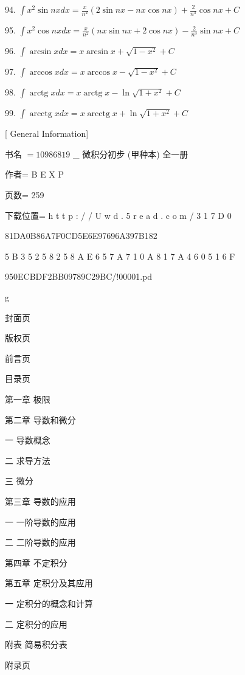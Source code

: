 \documentclass[10pt]{article}
\begin{document}
94. \(\int {x}^{2}\sin {nxdx} = \frac{x}{{n}^{2}}\left( {2\sin {nx} - {nx}\cos {nx}}\right) + \frac{2}{{n}^{3}}\cos {nx} + C\)

95. \(\int {x}^{2}\cos {nxdx} = \frac{x}{{n}^{2}}\left( {{nx}\sin {nx} + 2\cos {nx}}\right) - \frac{2}{{n}^{3}}\sin {nx} + C\)

96. \(\int \arcsin {xdx} = x\arcsin x + \sqrt{1 - {x}^{2}} + C\)

97. \(\int \arccos {xdx} = x\arccos x - \sqrt{1 - {x}^{2}} + C\)

98. \(\int \operatorname{arctg}{xdx} = x\operatorname{arctg}x - \ln \sqrt{1 + {x}^{2}} + C\)

99. \(\int \operatorname{arcctg}{xdx} = x\operatorname{arcctg}x + \ln \sqrt{1 + {x}^{2}} + C\)

[ General Information]

书名 \(= {10986819}\) \_ 微积分初步 (甲种本) 全一册

作者= B E X P

页数= 259

下载位置= h t t p : / / U w d . 5 r e a d . c o m / 3 1 7 D 0

81DA0B86A7F0CD5E6E97696A397B182

5 B 3 5 2 5 8 2 5 8 A E 6 5 7 A 7 1 0 A 8 1 7 A 4 6 0 5 1 6 F

950ECBDF2BB09789C29BC/!00001.pd

g

封面页

版权页

前言页

目录页

第一章 极限

第二章 导数和微分

一 导数概念

二 求导方法

三 微分

第三章 导数的应用

一 一阶导数的应用

二 二阶导数的应用

第四章 不定积分

第五章 定积分及其应用

一 定积分的概念和计算

二 定积分的应用

附表 简易积分表

附录页
\end{document}
